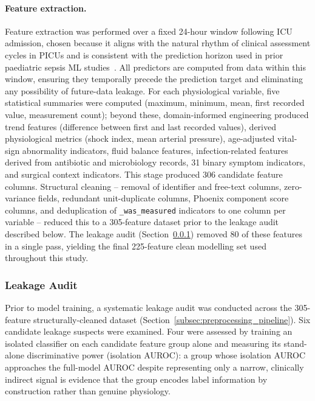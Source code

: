 \documentclass[final,3p,times]{elsarticle}
\begin{document}
\paragraph{Feature extraction.} Feature extraction was performed
over a fixed 24-hour window following ICU admission, chosen
because it aligns with the natural rhythm of clinical assessment
cycles in PICUs and is consistent with the prediction horizon used
in prior paediatric sepsis ML studies~\cite{le2019, chanci2025}.
All predictors are computed from data within this window, ensuring
they temporally precede the prediction target and eliminating any
possibility of future-data leakage. For each physiological
variable, five statistical summaries were computed (maximum,
minimum, mean, first recorded value, measurement count); beyond
these, domain-informed engineering produced trend features
(difference between first and last recorded values), derived
physiological metrics (shock index, mean arterial pressure),
age-adjusted vital-sign abnormality indicators, fluid balance
features, infection-related features derived from antibiotic and
microbiology records, 31 binary symptom indicators, and surgical
context indicators. This stage produced 306 candidate feature columns. Structural
cleaning -- removal of identifier and free-text columns,
zero-variance fields, redundant unit-duplicate columns, Phoenix
component score columns, and deduplication of
\texttt{\_was\_measured} indicators to one column per variable --
reduced this to a 305-feature dataset prior to the leakage audit
described below. The leakage audit (Section~\ref{subsec:leakage})
removed 80 of these features in a single pass, yielding the final
225-feature clean modelling set used throughout this study.

\subsubsection{Leakage Audit}
\label{subsec:leakage}

Prior to model training, a systematic leakage audit was conducted
across the 305-feature structurally-cleaned dataset
(Section~\ref{subsec:preprocessing_pipeline}). Six candidate
leakage suspects were examined. Four were assessed by training an
isolated classifier on each candidate feature group alone and
measuring its stand-alone discriminative power (isolation AUROC):
a group whose isolation AUROC approaches the full-model AUROC
despite representing only a narrow, clinically indirect signal is
evidence that the group encodes label information by construction
rather than genuine physiology.
\end{document}

